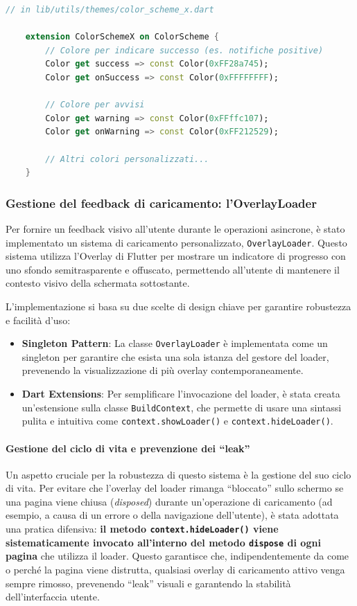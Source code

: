 \begin{lstlisting}[language=Dart, caption={Definizione dell'estensione \texttt{ColorSchemeX} per aggiungere colori personalizzati al tema.}, label={lst:colorscheme_extension}]
	// in lib/utils/themes/color_scheme_x.dart
	
	extension ColorSchemeX on ColorScheme {
		// Colore per indicare successo (es. notifiche positive)
		Color get success => const Color(0xFF28a745);
		Color get onSuccess => const Color(0xFFFFFFFF);
		
		// Colore per avvisi
		Color get warning => const Color(0xFFffc107);
		Color get onWarning => const Color(0xFF212529);
		
		// Altri colori personalizzati...
	}
\end{lstlisting}

\subsubsection{Gestione del feedback di caricamento: l'OverlayLoader}
Per fornire un feedback visivo all'utente durante le operazioni asincrone, è stato implementato un sistema di caricamento personalizzato, \texttt{OverlayLoader}.
Questo sistema utilizza l'Overlay di Flutter per mostrare un indicatore di progresso con uno sfondo semitrasparente e offuscato, permettendo all'utente di mantenere il contesto visivo della schermata sottostante.

L'implementazione si basa su due scelte di design chiave per garantire robustezza e facilità d'uso:
\begin{itemize}
	\item \textbf{Singleton Pattern}: La classe \texttt{OverlayLoader} è implementata come un singleton per garantire che esista una sola istanza del gestore del loader, prevenendo la visualizzazione di più overlay contemporaneamente.
	\item \textbf{Dart Extensions}: Per semplificare l'invocazione del loader, è stata creata un'estensione sulla classe \texttt{BuildContext}, che permette di usare una sintassi pulita e intuitiva come \texttt{context.showLoader()} e \texttt{context.hideLoader()}.
\end{itemize}

\paragraph{Gestione del ciclo di vita e prevenzione dei ``leak''}
Un aspetto cruciale per la robustezza di questo sistema è la gestione del suo ciclo di vita.
Per evitare che l'overlay del loader rimanga ``bloccato'' sullo schermo se una pagina viene chiusa (\emph{disposed}) durante un'operazione di caricamento (ad esempio, a causa di un errore o della navigazione dell'utente), è stata adottata una pratica difensiva: \textbf{il metodo \texttt{context.hideLoader()} viene sistematicamente invocato all'interno del metodo \texttt{dispose} di ogni pagina} che utilizza il loader.
Questo garantisce che, indipendentemente da come o perché la pagina viene distrutta, qualsiasi overlay di caricamento attivo venga sempre rimosso, prevenendo ``leak'' visuali e garantendo la stabilità dell'interfaccia utente.

